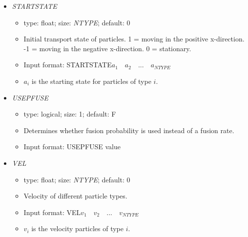 \documentclass[12pt]{article}
\begin{document}
\begin{itemize}
\begin{itemize}
	\item  type: float; size: \textit{NTYPE} $\times$ \textit{NPROT}; default: 0
	\item Initial protein content in particles.
	\item Input format: STARTPROT\quad$i$\quad$c_{i,1}\quad c_{i,2}\quad...\quad k_{i,NPROT}$
	\item $c_{i,j}$ is the amount of protein of type $j$ within particle type $i$
	\item Multiple lines should be used for different values of $i$.
\end{itemize}
%
\item {\it STARTSTATE}
\begin{itemize}
	\item  type: float; size: \textit{NTYPE}; default: 0
	\item Initial transport state of particles. 1 = moving in the positive x-direction. -1 = moving in the negative x-direction. 0 = stationary.
	\item Input format: STARTSTATE\quad$a_{1}\quad a_{2}\quad...\quad a_{NTYPE}$
	\item $a_{i}$ is the starting state for particles of type $i$.
\end{itemize}
%
\item {\it USEPFUSE}
\begin{itemize}
	\item  type: logical; size: 1; default: F
	\item Determines whether fusion probability is used instead of a fusion rate.
	\item Input format: USEPFUSE value
\end{itemize}	
%
\item {\it VEL}
\begin{itemize}
	\item  type: float; size: \textit{NTYPE}; default: 0
	\item Velocity of different particle types.
	\item Input format: VEL\quad$v_{1}\quad v_{2}\quad...\quad v_{NTYPE}$
	\item $v_{i}$ is the velocity particles of type $i$.
\end{itemize}


\end{itemize}

 

\end{document}

